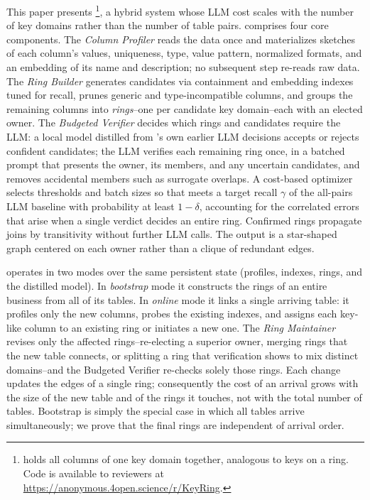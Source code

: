 This paper presents \ourmethod\footnote{\ourmethod holds all columns of one key domain together, analogous to keys on a ring. Code is available to reviewers at \url{https://anonymous.4open.science/r/KeyRing}.}, a hybrid system whose LLM cost scales with the number of key domains rather than the number of table pairs. \ourmethod comprises four core components. The \emph{Column Profiler} reads the data once and materializes sketches of each column’s values, uniqueness, type, value pattern, normalized formats, and an embedding of its name and description; no subsequent step re-reads raw data. The \emph{Ring Builder} generates candidates via containment and embedding indexes tuned for recall, prunes generic and type-incompatible columns, and groups the remaining columns into \emph{rings}--one per candidate key domain--each with an elected owner. The \emph{Budgeted Verifier} decides which rings and candidates require the LLM: a local model distilled from \ourmethod’s own earlier LLM decisions accepts or rejects confident candidates; the LLM verifies each remaining ring once, in a batched prompt that presents the owner, its members, and any uncertain candidates, and removes accidental members such as surrogate overlaps. A cost-based optimizer selects thresholds and batch sizes so that \ourmethod meets a target recall $\gamma$ of the all-pairs LLM baseline with probability at least $1-\delta$, accounting for the correlated errors that arise when a single verdict decides an entire ring. Confirmed rings propagate joins by transitivity without further LLM calls. The output is a star-shaped graph centered on each owner rather than a clique of redundant edges.

\ourmethod operates in two modes over the same persistent state (profiles, indexes, rings, and the distilled model). In \emph{bootstrap} mode it constructs the rings of an entire business from all of its tables. In \emph{online} mode it links a single arriving table: it profiles only the new columns, probes the existing indexes, and assigns each key-like column to an existing ring or initiates a new one. The \emph{Ring Maintainer} revises only the affected rings--re-electing a superior owner, merging rings that the new table connects, or splitting a ring that verification shows to mix distinct domains--and the Budgeted Verifier re-checks solely those rings. Each change updates the edges of a single ring; consequently the cost of an arrival grows with the size of the new table and of the rings it touches, not with the total number of tables. Bootstrap is simply the special case in which all tables arrive simultaneously; we prove that the final rings are independent of arrival order.

